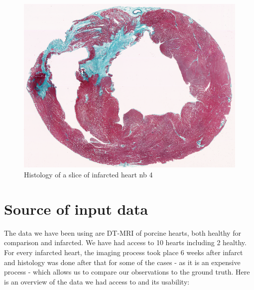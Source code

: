 \begin{figure}[h!]
    \centering
    \includegraphics[width=\textwidth]{figures/Gip4_histology}
    \caption{Histology of a slice of infarcted heart nb 4}
    \label{fig:histology_pig_4}
\end{figure}

\section{Source of input data}

The data we have been using are DT-MRI of porcine hearts, both healthy for comparison and infarcted. We have had access to 10 hearts including 2 healthy. For every infarcted heart, the imaging process took place 6 weeks after infarct and histology was done after that for some of the cases - as it is an expensive process - which allows us to compare our observations to the ground truth. Here is an overview of the data we had access to and its usability:

